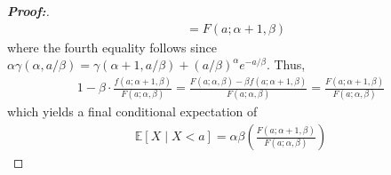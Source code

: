 \documentclass[11pt,twoside]{article}
\theoremstyle{definition}
\theoremstyle{remark}
\begin{document}
\begin{proof}[\textbf{Proof:}]
\begin{align*}
    &= F(a; \alpha + 1, \beta)
\end{align*}
where the fourth equality follows since $\alpha \gamma( \alpha, a / \beta) = \gamma(\alpha + 1, a / \beta) + (a / \beta)^\alpha e^{- a / \beta}$. Thus,
\begin{align*}
    1 - \beta \cdot \frac{f(a; \alpha + 1, \beta)}{F(a; \alpha, \beta)} = \frac{F(a; \alpha, \beta) - \beta f(a; \alpha + 1, \beta)}{F(a; \alpha, \beta)} = \frac{F(a; \alpha + 1, \beta)}{F(a; \alpha, \beta)}
\end{align*}
which yields a final conditional expectation of
\begin{align*}
    \mathbb{E}\left[X \mid X < a \right] = \alpha \beta \left(\frac{F(a; \alpha + 1, \beta)}{F(a; \alpha, \beta)}\right)
\end{align*}
\end{proof}
\end{document}
